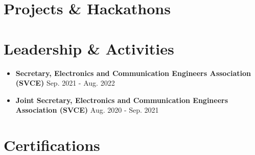 \documentclass[letterpaper,10.95pt]{article}
\newcommand{\resumeSubHeadingListStart}{\begin{itemize}[leftmargin=0.15in, label={}]}
\newcommand{\resumeSubHeadingListEnd}{\end{itemize}}
\newcommand{\resumeItemListStart}{\begin{itemize}}
\newcommand{\resumeHackathonItemListStart}{\begin{itemize}[topsep=0pt,partopsep=0pt]}
\newcommand{\resumeItemListEnd}{\end{itemize}\vspace{-5pt}}
\newcommand{\resumeHackathonItemListEnd}{\end{itemize}}
\begin{document}


\section{Projects \& Hackathons}
\vspace{-1pt}
\begin{itemize}[leftmargin=0.15in, itemsep=0.5pt]

\resumeHackathonItemListStart
\resumeHackathonItemListEnd

\resumeHackathonItemListStart
\resumeHackathonItemListEnd

\resumeHackathonItemListStart
\resumeHackathonItemListEnd

\end{itemize}
\vspace{6pt}

\section{Leadership \& Activities}

\resumeSubHeadingListStart

\item \textbf{Secretary, Electronics and Communication Engineers Association (SVCE)}
\hfill {Sep. 2021 - Aug. 2022}
\resumeItemListStart
\resumeItemListEnd

\item \textbf{Joint Secretary, Electronics and Communication Engineers Association (SVCE)}
\hfill {Aug. 2020 - Sep. 2021}
\resumeItemListStart
\resumeItemListEnd

\resumeSubHeadingListEnd

\section{Certifications}
    \begin{itemize}[leftmargin=0.15in, label={}]
    \small{\item{
    }}
 \end{itemize}
\end{document}
